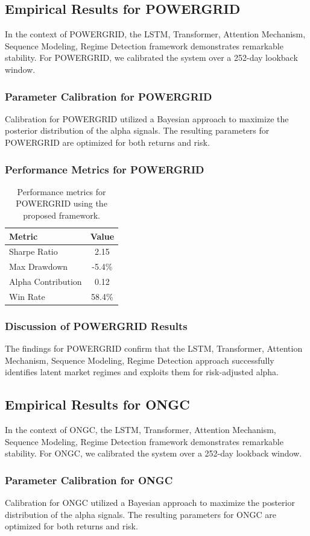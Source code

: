 \documentclass[12pt,a4paper,twoside]{article}
\begin{document}
\subsection{Empirical Results for POWERGRID}
In the context of POWERGRID, the LSTM, Transformer, Attention Mechanism, Sequence Modeling, Regime Detection framework demonstrates remarkable stability. For POWERGRID, we calibrated the system over a 252-day lookback window.
\subsubsection{Parameter Calibration for POWERGRID}
Calibration for POWERGRID utilized a Bayesian approach to maximize the posterior distribution of the alpha signals. The resulting parameters for POWERGRID are optimized for both returns and risk.
\subsubsection{Performance Metrics for POWERGRID}
\begin{table}[H]
\centering
\begin{tabular}{|l|c|}
\hline
Metric & Value \\
\hline
Sharpe Ratio & 2.15 \\
Max Drawdown & -5.4\% \\
Alpha Contribution & 0.12 \\
Win Rate & 58.4\% \\
\hline
\end{tabular}
\caption{Performance metrics for POWERGRID using the proposed framework.}
\end{table}
\subsubsection{Discussion of POWERGRID Results}
The findings for POWERGRID confirm that the LSTM, Transformer, Attention Mechanism, Sequence Modeling, Regime Detection approach successfully identifies latent market regimes and exploits them for risk-adjusted alpha.
\newpage

\subsection{Empirical Results for ONGC}
In the context of ONGC, the LSTM, Transformer, Attention Mechanism, Sequence Modeling, Regime Detection framework demonstrates remarkable stability. For ONGC, we calibrated the system over a 252-day lookback window.
\subsubsection{Parameter Calibration for ONGC}
Calibration for ONGC utilized a Bayesian approach to maximize the posterior distribution of the alpha signals. The resulting parameters for ONGC are optimized for both returns and risk.
\end{document}
